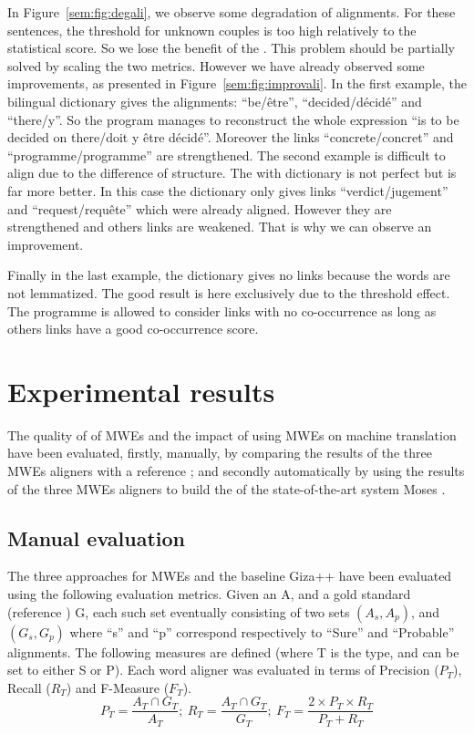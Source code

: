 \documentclass[output=paper,modfonts,nonflat]{langsci/langscibook}
\begin{document}
In Figure~\ref{sem:fig:degali}, we observe some degradation of alignments.
For these sentences, the threshold for unknown couples is too high relatively to the statistical score. 
So we lose the benefit of the . 
This problem should be partially solved by scaling the two metrics. However we have already observed some improvements, as presented in Figure~\ref{sem:fig:improvali}. In the first example, the bilingual dictionary gives the alignments: ``be/être'', ``decided/décidé'' and ``there/y''. So the program manages to reconstruct the whole expression ``is to be decided on there/doit y être décidé''. Moreover the links ``concrete/concret'' and ``programme/programme'' are strengthened. The second example is difficult to align due to the difference of structure. The  with dictionary is not perfect but is far more better. In this case the dictionary only gives links ``verdict/jugement'' and ``request/requête'' which were already aligned. However they are strengthened and others links are weakened. That is why we can observe an improvement.

Finally in the last example, the dictionary gives no links because the words are not lemmatized. The good result is here exclusively due to the threshold effect. The programme is allowed to consider links with no co-occurrence as long as others links have a good co-occurrence score.


\section{Experimental results}
The quality of  of MWEs and the impact of using MWEs on machine translation have been evaluated, firstly, manually, by comparing the results of the three MWEs aligners with a reference ;
and secondly automatically by using the results of the three MWEs aligners to build the  of the state-of-the-art  system Moses \citep{koehn2007moses}.


\subsection{Manual evaluation}

The three approaches for MWEs  and the baseline Giza++ \citep{och2000improved} have been evaluated using the following evaluation metrics. 
Given an  A, and a gold standard  (reference ) G, each such  set eventually consisting of two sets $(A_s, A_p)$, and $(G_s, G_p)$ where ``s'' and ``p'' correspond respectively to ``Sure'' and ``Probable'' alignments. 
The following measures are defined (where T is the  type, and can be set to either S or P). Each word aligner was evaluated in terms of Precision ($P_T$), Recall ($R_T$) and F-Measure ($F_T$).
\begin{equation}
P_T=\frac{A_T \cap G_T}{A_T} ;~
R_T=\frac{A_T \cap G_T}{G_T} ;~
F_T=\frac{2 \times P_T \times R_T}{P_T + R_T}
\label{sem:equa:PRF}
\end{equation}
\end{document}
